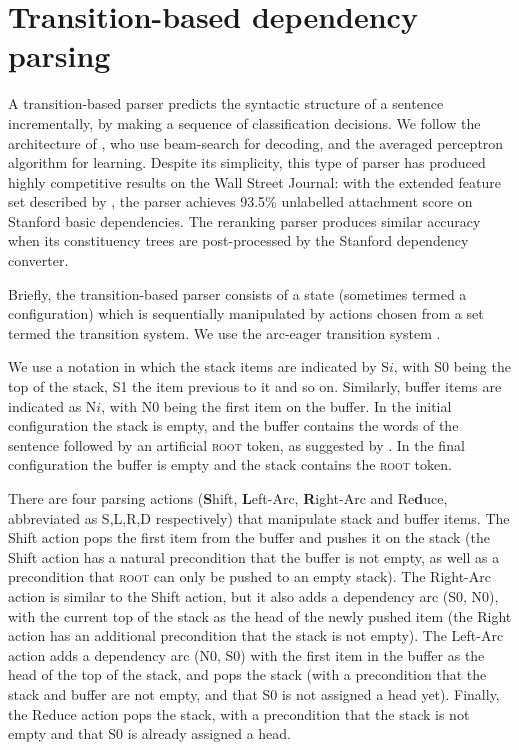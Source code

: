 \documentclass[11pt,letterpaper]{article}
\begin{document}
\section{Transition-based dependency parsing}

A transition-based parser predicts the syntactic structure of a sentence incrementally,
by making a sequence of classification decisions.  We follow the architecture of
\citet{zhang:cl11}, who use beam-search for decoding, and the averaged
perceptron algorithm for learning.  Despite its simplicity, this type of parser
has produced highly competitive results on the Wall Street Journal: with the
extended feature set described by \citet{zhang:11}, the parser achieves 93.5\%
unlabelled attachment score on Stanford basic dependencies.  The \citet{Charniak05a}
reranking parser produces similar accuracy when its constituency trees are post-processed
by the Stanford dependency converter.

Briefly, the transition-based parser consists of a state (sometimes termed a
configuration) which is sequentially manipulated by actions chosen from a set
termed the transition system. We use the arc-eager transition system
\citep{nivre:03,nivre:cl}.

We use a notation in which the stack items are indicated by S$i$, with S0 being
the top of the stack, S1 the item previous to it and so on. Similarly, buffer
items are indicated as N$i$, with N0 being the first item on the buffer.
In the initial configuration the stack is empty, and the buffer contains the words
of the sentence followed by an artificial \textsc{root} token, as suggested by
\citet{nivre:squib}.
In the final configuration the buffer is empty and the stack contains the 
\textsc{root} token.

There are four parsing actions (\textbf{S}hift, \textbf{L}eft-Arc,
\textbf{R}ight-Arc and Re\textbf{d}uce, abbreviated as S,L,R,D respectively)
that manipulate stack and buffer items. The Shift action pops the first item
from the buffer and pushes it on the stack (the Shift action has a natural
precondition that the buffer is not empty, as well as a precondition that
\textsc{root} can only be pushed to an empty stack). The Right-Arc action is
similar to the Shift action, but it also adds a dependency arc (S0, N0),
with the current top of the stack as the head of the newly pushed item (the Right
action has an additional precondition that the stack is not empty). The Left-Arc
action adds a dependency arc (N0, S0) with the first item in the buffer as the
head of the top of the stack, and pops the stack (with a precondition that the
stack and buffer are not empty, and that S0 is not assigned a head yet). Finally,
the Reduce action pops the stack, with a precondition that the stack is not empty
and that S0 is already assigned a head.
\end{document}
